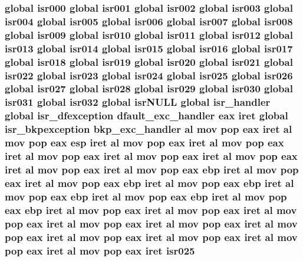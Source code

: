 \subsubsection[{\texorpdfstring{isr025}{isr025}}]{\setlength{\rightskip}{0pt plus 5cm}global {\bf isr000} global {\bf isr001} global {\bf isr002} global {\bf isr003} global {\bf isr004} global {\bf isr005} global {\bf isr006} global {\bf isr007} global {\bf isr008} global {\bf isr009} global {\bf isr010} global {\bf isr011} global {\bf isr012} global {\bf isr013} global {\bf isr014} global {\bf isr015} global {\bf isr016} global {\bf isr017} global {\bf isr018} global {\bf isr019} global {\bf isr020} global {\bf isr021} global {\bf isr022} global {\bf isr023} global {\bf isr024} global isr025 global {\bf isr026} global {\bf isr027} global {\bf isr028} global {\bf isr029} global {\bf isr030} global {\bf isr031} global isr032 global isr\+N\+U\+LL global isr\+\_\+handler global {\bf isr\+\_\+dfexception} {\bf dfault\+\_\+exc\+\_\+handler} eax iret global {\bf isr\+\_\+bkpexception} {\bf bkp\+\_\+exc\+\_\+handler} {\bf al} {\bf mov} pop eax iret {\bf al} {\bf mov} pop eax esp iret {\bf al} {\bf mov} pop eax iret {\bf al} {\bf mov} pop eax iret {\bf al} {\bf mov} pop eax iret {\bf al} {\bf mov} pop eax iret {\bf al} {\bf mov} pop eax iret {\bf al} {\bf mov} pop eax iret {\bf al} {\bf mov} pop eax ebp iret {\bf al} {\bf mov} pop eax iret {\bf al} {\bf mov} pop eax ebp iret {\bf al} {\bf mov} pop eax ebp iret {\bf al} {\bf mov} pop eax ebp iret {\bf al} {\bf mov} pop eax ebp iret {\bf al} {\bf mov} pop eax ebp iret {\bf al} {\bf mov} pop eax iret {\bf al} {\bf mov} pop eax iret {\bf al} {\bf mov} pop eax iret {\bf al} {\bf mov} pop eax iret {\bf al} {\bf mov} pop eax iret {\bf al} {\bf mov} pop eax iret {\bf al} {\bf mov} pop eax iret {\bf al} {\bf mov} pop eax iret {\bf al} {\bf mov} pop eax iret {\bf al} {\bf mov} pop eax iret isr025}\hypertarget{isrs_8as_a76d590278948cda819d4062f63a12650}{}\label{isrs_8as_a76d590278948cda819d4062f63a12650}

